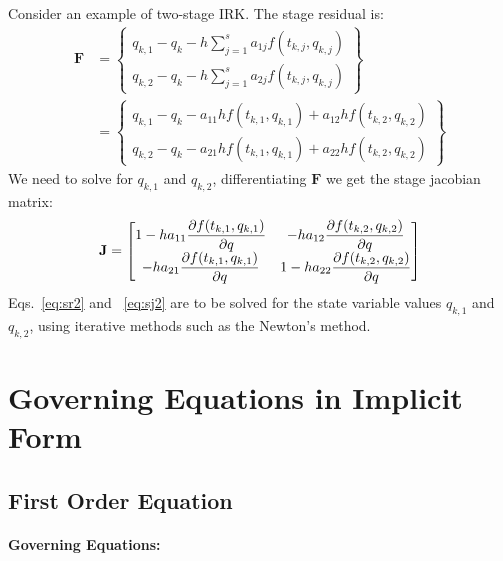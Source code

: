 \documentclass[pdftex,11pt,letter]{article}
\begin{document}
Consider an example of two-stage IRK. The stage residual is:
\begin{equation}\label{eq:sr2}
  \begin{split}
    \mathbf{F} & = \left\{
    \begin{array}{rr} q_{k,1} - q_{k} - h \sum_{j=1}^s a_{1j} f(t_{k,j}, q_{k,j}) \\
      q_{k,2} - q_{k} - h \sum_{j=1}^s a_{2j} f(t_{k,j}, q_{k,j})
    \end{array} \right\}\\
    & = \left\{
    \begin{array}{rr} q_{k,1} - q_{k} -  a_{11} h f(t_{k,1}, q_{k,1}) + a_{12} h f(t_{k,2}, q_{k,2})\\
      q_{k,2} - q_{k} - a_{21} h f(t_{k,1}, q_{k,1}) + a_{22} h f(t_{k,2}, q_{k,2})
    \end{array} \right\}
  \end{split}
\end{equation}
We need to solve for $q_{k,1}$ and $q_{k,2}$, differentiating $\mathbf{F}$ we get
the stage jacobian matrix:
\begin{equation}\label{eq:sj2}
  \mathbf{J} =  \begin{bmatrix}
    1 - h a_{11} \dfrac{\partial f(t_{k,1}, q_{k,1})}{\partial q} & - h a_{12} \dfrac{\partial f(t_{k,2}, q_{k,2})}{\partial q}\\
    - h a_{21} \dfrac{\partial f(t_{k,1}, q_{k,1})}{\partial q}   & 1 - h a_{22} \dfrac{\partial f(t_{k,2}, q_{k,2})}{\partial q}
  \end{bmatrix}
\end{equation}
Eqs.~\eqref{eq:sr2} and ~\eqref{eq:sj2} are to be solved for the state
variable values $q_{k,1}$ and $q_{k,2}$, using iterative methods such as the
Newton's method.


\section{Governing Equations in Implicit Form}

\subsection{First Order Equation}

\paragraph{Governing Equations:}
\end{document}
